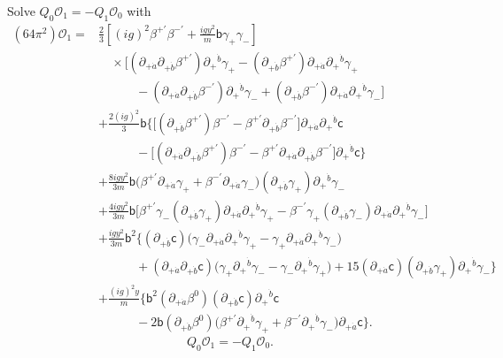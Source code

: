 \documentclass[11pt]{article}
\numberwithin{equation}{section}
\numberwithin{figure}{section}
\numberwithin{table}{section}
\begin{document}
\begin{proofbox}
Solve $Q_0\mathcal O_1=-Q_1\mathcal O_0$ with
\begin{equation}\label{eq-SQEDfirst}
\begin{aligned}
(64\pi^2)\mathcal O_1
={}&\frac23\left[(ig)^2\beta^{+\prime}\beta^{-\prime}
             +\frac{igy^2}{m}\mathsf b\gamma_+\gamma_-\right]\\
&\quad\times\Big[
 (\partial_{+\dot a}\partial_{+\dot b}\beta^{+\prime})
                                      \partial_+{}^{\dot b}\gamma_+
 -(\partial_{+\dot b}\beta^{+\prime})
                         \partial_{+\dot a}\partial_+{}^{\dot b}\gamma_+\\
&\qquad\quad
 -(\partial_{+\dot a}\partial_{+\dot b}\beta^{-\prime})
                                      \partial_+{}^{\dot b}\gamma_-
 +(\partial_{+\dot b}\beta^{-\prime})
                         \partial_{+\dot a}\partial_+{}^{\dot b}\gamma_-
 \Big]\\
&+\frac{2(ig)^2}{3}\mathsf b\Big\{
 \bigl[(\partial_{+\dot b}\beta^{+\prime})\beta^{-\prime}
       -\beta^{+\prime}\partial_{+\dot b}\beta^{-\prime}\bigr]
                         \partial_{+\dot a}\partial_+{}^{\dot b}\mathsf c\\
&\qquad\quad-
 \bigl[(\partial_{+\dot a}\partial_{+\dot b}\beta^{+\prime})\beta^{-\prime}
       -\beta^{+\prime}\partial_{+\dot a}\partial_{+\dot b}\beta^{-\prime}\bigr]
                                      \partial_+{}^{\dot b}\mathsf c
 \Big\}\\
&+\frac{8igy^2}{3m}\mathsf b
  \bigl(\beta^{+\prime}\partial_{+\dot a}\gamma_+
       +\beta^{-\prime}\partial_{+\dot a}\gamma_-\bigr)
  (\partial_{+\dot b}\gamma_+)\partial_+{}^{\dot b}\gamma_-\\
&+\frac{4igy^2}{3m}\mathsf b\Big[
 \beta^{+\prime}\gamma_-(\partial_{+\dot b}\gamma_+)
                         \partial_{+\dot a}\partial_+{}^{\dot b}\gamma_+
 -\beta^{-\prime}\gamma_+(\partial_{+\dot b}\gamma_-)
                         \partial_{+\dot a}\partial_+{}^{\dot b}\gamma_-
 \Big]\\
&+\frac{igy^2}{3m}\mathsf b^2\Big\{
 (\partial_{+\dot b}\mathsf c)
 \bigl(\gamma_-\partial_{+\dot a}\partial_+{}^{\dot b}\gamma_+
      -\gamma_+\partial_{+\dot a}\partial_+{}^{\dot b}\gamma_-\bigr)\\
&\qquad\quad+
 (\partial_{+\dot a}\partial_{+\dot b}\mathsf c)
 \bigl(\gamma_+\partial_+{}^{\dot b}\gamma_-
      -\gamma_-\partial_+{}^{\dot b}\gamma_+\bigr)
 +15(\partial_{+\dot a}\mathsf c)
       (\partial_{+\dot b}\gamma_+)\partial_+{}^{\dot b}\gamma_-
 \Big\}\\
&+\frac{(ig)^2y}{m}\Big\{
 \mathsf b^2(\partial_{+\dot a}\beta^0)
       (\partial_{+\dot b}\mathsf c)\partial_+{}^{\dot b}\mathsf c\\
&\qquad\quad-2\mathsf b(\partial_{+\dot b}\beta^0)
   \bigl(\beta^{+\prime}\partial_+{}^{\dot b}\gamma_+
        +\beta^{-\prime}\partial_+{}^{\dot b}\gamma_-\bigr)
                         \partial_{+\dot a}\mathsf c
 \Big\}.
\end{aligned}
\end{equation}
\begin{equation}\label{eq-SQEDfirst-closure}
Q_0\mathcal O_1=-Q_1\mathcal O_0.
\end{equation}


\end{proofbox}
\end{document}
